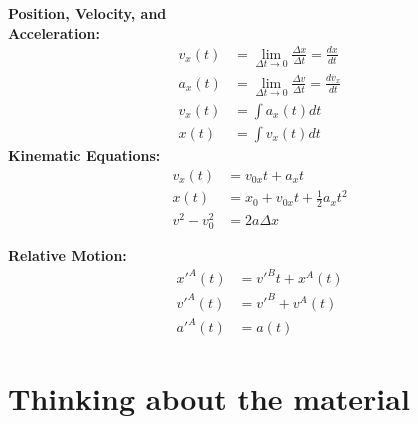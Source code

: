 \newpage
\begin{importantEquations}
\begin{multicols}{2}
\begin{center}
\textbf{Position, Velocity, and\\ Acceleration:}
\begin{align*}
v_x(t)&=\lim_{\Delta t\to 0}\frac{\Delta x}{\Delta t}=\frac{dx}{dt}\\
a_x(t)&=\lim_{\Delta t\to 0}\frac{\Delta v}{\Delta t}=\frac{dv_x}{dt}\\
v_x(t)&=\int a_x(t)dt\\
x(t)&=\int v_x(t)dt
\end{align*}
\textbf{Kinematic Equations:}
\begin{align*}
v_x(t)&=v_{0x}t+a_xt\\
x(t)&=x_0+v_{0x}t+\frac{1}{2}a_xt^2\\
v^2-v_0^2&=2a\Delta x 
\end{align*}
\end{center}
\columnbreak
\begin{center}
\textbf{Relative Motion:}\\
\begin{align*}
x'^A(t) &= v'^Bt + x^A(t)\\
v'^A(t) &=v'^B+v^A(t)\\
a'^A(t) &= a(t)
\end{align*}
\end{center}
\end{multicols}
\end{importantEquations}


\newpage
\section{Thinking about the material}
